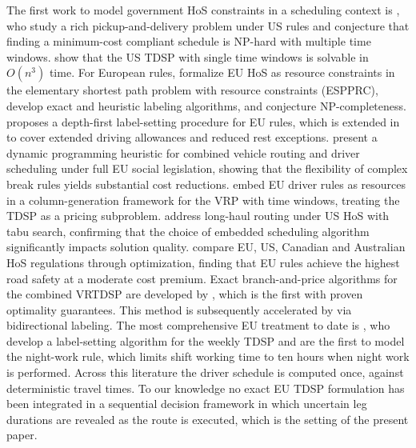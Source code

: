 \documentclass[preprint,12pt,3p]{elsarticle}
\begin{document}
The first work to model government HoS constraints in a scheduling context is \citet{xu_solving_2003}, who study a rich pickup-and-delivery problem under US rules and conjecture that finding a minimum-cost compliant schedule is NP-hard with multiple time windows. \citet{archetti_trip_2009} show that the US TDSP with single time windows is solvable in $O(n^3)$ time. For European rules, \citet{drexl_labelling_2010} formalize EU HoS as resource constraints in the elementary shortest path problem with resource constraints (ESPPRC), develop exact and heuristic labeling algorithms, and conjecture NP-completeness. \citet{goel_vehicle_2009} proposes a depth-first label-setting procedure for EU rules, which is extended in \citet{goel_truck_2010} to cover extended driving allowances and reduced rest exceptions. \citet{kok_dynamic_2010} present a dynamic programming heuristic for combined vehicle routing and driver scheduling under full EU social legislation, showing that the flexibility of complex break rules yields substantial cost reductions. \citet{prescott-gagnon_european_2010} embed EU driver rules as resources in a column-generation framework for the VRP with time windows, treating the TDSP as a pricing subproblem. \citet{rancourt_long-haul_2013} address long-haul routing under US HoS with tabu search, confirming that the choice of embedded scheduling algorithm significantly impacts solution quality. \citet{goel_hours_2014} compare EU, US, Canadian and Australian HoS regulations through optimization, finding that EU rules achieve the highest road safety at a moderate cost premium. Exact branch-and-price algorithms for the combined VRTDSP are developed by \citet{goel_exact_2017}, which is the first with proven optimality guarantees. This method is subsequently accelerated by \citet{tilk_bidirectional_2020} via bidirectional labeling. The most comprehensive EU treatment to date is \citet{garaix_label-setting_2024}, who develop a label-setting algorithm for the weekly TDSP and are the first to model the night-work rule, which limits shift working time to ten hours when night work is performed. Across this literature the driver schedule is computed once, against deterministic travel times. To our knowledge no exact EU TDSP formulation has been integrated in a sequential decision framework in which uncertain leg durations are revealed as the route is executed, which is the setting of the present paper.
\end{document}
